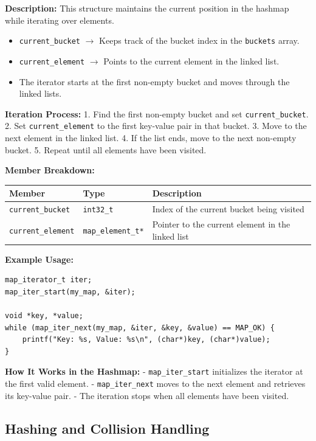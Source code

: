 \documentclass[titlepage]{article}
\begin{document}
\textbf{Description:}
This structure maintains the current position in the hashmap while iterating over elements.

\begin{itemize}
    \item \texttt{current\_bucket} $\rightarrow$ Keeps track of the bucket index in the \texttt{buckets} array.
    \item \texttt{current\_element} $\rightarrow$ Points to the current element in the linked list.
    \item The iterator starts at the first non-empty bucket and moves through the linked lists.
\end{itemize}

\textbf{Iteration Process:}
1. Find the first non-empty bucket and set \texttt{current\_bucket}.
2. Set \texttt{current\_element} to the first key-value pair in that bucket.
3. Move to the next element in the linked list.
4. If the list ends, move to the next non-empty bucket.
5. Repeat until all elements have been visited.

\textbf{Member Breakdown:}
\begin{center}
\begin{tabular}{@{} l l l @{} }
\toprule
\textbf{Member} & \textbf{Type} & \textbf{Description} \\
\midrule
\texttt{current\_bucket} & \texttt{int32\_t} & Index of the current bucket being visited \\
\texttt{current\_element} & \texttt{map\_element\_t*} & Pointer to the current element in the linked list \\
\bottomrule
\end{tabular}
\end{center}

\textbf{Example Usage:}
\begin{verbatim}
map_iterator_t iter;
map_iter_start(my_map, &iter);

void *key, *value;
while (map_iter_next(my_map, &iter, &key, &value) == MAP_OK) {
    printf("Key: %s, Value: %s\n", (char*)key, (char*)value);
}
\end{verbatim}

\textbf{How It Works in the Hashmap:}
- \texttt{map\_iter\_start} initializes the iterator at the first valid element.
- \texttt{map\_iter\_next} moves to the next element and retrieves its key-value pair.
- The iteration stops when all elements have been visited.


\subsection{Hashing and Collision Handling}
\end{document}
